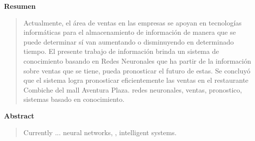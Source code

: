 \newpage
\begin{center}
 {\bf\LARGE Resumen}
\end{center} 
\vskip 0.5cm
\begin{quotation}
Actualmente, el área de ventas en las empresas se apoyan en tecnologías informáticas para el almacenamiento de información de manera que se puede determinar sí van aumentando o disminuyendo en determinado tiempo. El presente trabajo de información brinda un sistema de conocimiento basando en Redes Neuronales que ha partir de la información sobre ventas que se tiene, pueda pronosticar el futuro de estas.
Se concluyó que el sistema logra pronosticar eficientemente las ventas en el restaurante Combiche del mall Aventura Plaza.
\vskip 0.3cm
\hspace*{-0.6cm}{\bf Palabras claves:} redes neuronales, ventas, pronostico, sistemas basado en conocimiento.
\end{quotation}


\newpage
\begin{center}
 {\bf\LARGE Abstract}\vskip 1.5cm
\end{center} 
\begin{quotation}
Currently ...
\vskip 0.3cm
\hspace*{-0.6cm}{\bf Keywords:} neural networks, , intelligent systems.
\end{quotation}




